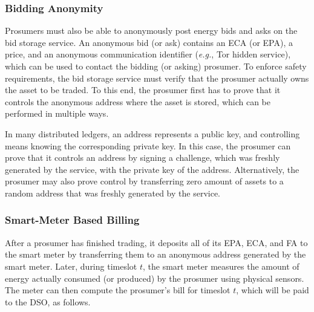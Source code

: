 \subsubsection{Bidding Anonymity}
Prosumers must also be able to anonymously post energy bids and asks on the
bid storage service.  An anonymous bid (or ask) contains an ECA (or
EPA), a price, and an anonymous communication identifier (\emph{e.g.},
Tor hidden service), which can be used to contact the bidding (or
asking) prosumer.  To enforce safety requirements, the bid storage
service must verify that the prosumer actually owns the asset to be
traded.  To this end, the prosumer first has to prove that it controls
the anonymous address where the asset is stored, which can be
performed in multiple ways.

In many distributed ledgers, an address represents a public key, and
controlling means knowing the corresponding private key.  In this
case, the prosumer can prove that it controls an address by signing a
challenge, which was freshly generated by the service, with the
private key of the address.  Alternatively, the prosumer may also
prove control by transferring zero amount of assets to a random
address that was freshly generated by the service.


\subsubsection{Smart-Meter Based Billing}
After a prosumer has finished trading, it deposits all of its EPA,
ECA, and FA to the smart meter by transferring them to an anonymous
address generated by the smart meter.  Later, during timeslot $t$, the
smart meter measures the amount of energy actually consumed (or
produced) by the prosumer using physical sensors.  The meter can then
compute the prosumer's bill for timeslot $t$, which will be paid to
the DSO, as follows.

